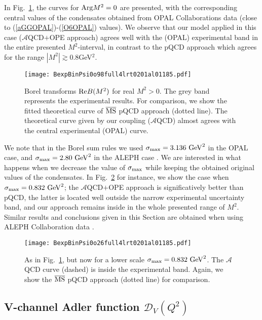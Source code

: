\documentclass[3p,times,twocolumn]{elsarticle}
\newcommand{\A}{{\mathcal{A}}}
\begin{document}
In Fig.~\ref{FigPsi0}, the curves for ${\rm Arg} M^2=0$ are presented, with the corresponding central values of the condensates obtained from OPAL Collaborations data (close to (\ref{aGGOPAL})-(\ref{O6OPAL}) values). We observe that our model applied in this case ($\A$QCD$+$OPE approach) agrees well with the (OPAL) experimental band in the entire presented $M^2$-interval, in contrast to the pQCD approach which agrees for the range $|M^2|\gtrsim 0.8$GeV$^2$. 


\begin{figure}[htb]
\vspace{9pt}
\centering\texttt{[image: BexpBinPsi0o98full4lrt0201al01185.pdf]}
\caption{Borel transforms ${\rm Re} B(M^2)$ for real $M^2 > 0$. The grey band represents the experimental results. For comparison, we show the fitted theoretical curve of $\overline{\rm MS}$ pQCD approach (dotted line). The theoretical curve given by our coupling ($\A$QCD) almost agrees with the central experimental (OPAL) curve.}
\label{FigPsi0}
\end{figure}
%

We note that in the Borel sum rules we used $\sigma_{\rm max}=3.136 \ {\rm GeV}^2$ in the OPAL case, and $\sigma_{\rm max}=2.80 \ {\rm GeV}^2$ in the ALEPH case \cite{3danQCD1,3danQCD2}. We are interested in what happens when we decrease the value of $\sigma_{\rm max}$ while keeping the obtained original values of the condensates. In Fig.~\ref{FigPsi0o26} for instance, we show the case when $\sigma_{\rm max}=0.832 \ {\rm GeV}^2$; the $\A$QCD$+$OPE approach is significatively better than pQCD, the latter is located well outside the narrow experimental uncertainty band, and our approach remains inside in the whole presented range of $M^2$.
Similar results and conclusions given in this Section are obtained when using ALEPH Collaboration data \cite{3danQCD1,3danQCD2}.
\begin{figure}[htb]
\vspace{9pt}
\centering\texttt{[image: BexpBinPsi0o26full4lrt0201al01185.pdf]}
\caption{As in Fig.~\ref{FigPsi0}, but now for a lower scale $\sigma_{\rm max}=0.832 \ {\rm GeV}^2$. The $\A$QCD curve (dashed) is inside the experimental band. Again, we show the $\overline{\rm MS}$ pQCD approach (dotted line) for comparison.}
\label{FigPsi0o26}
\end{figure}
%

\subsection{V-channel Adler function $\mathcal{D}_V(Q^2)$}
\end{document}
